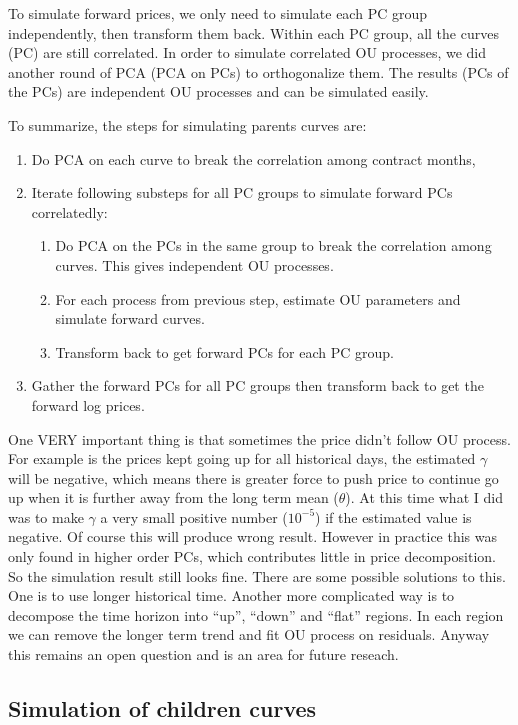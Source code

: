 \documentclass[12pt]{article}
\begin{document}
To simulate forward prices, we only need to simulate
each PC group independently, then transform them back.
Within each PC group, all the curves (PC) are still correlated.
In order to simulate correlated OU processes,
we did another round of PCA (PCA on PCs) to orthogonalize them. 
The results (PCs of the PCs) are independent OU processes
and can be simulated easily. 

To summarize, the steps for simulating parents curves are:
\begin{enumerate}
\item Do PCA on each curve to break the 
correlation among contract months, 
\item Iterate following substeps for all PC groups 
to simulate forward PCs correlatedly:
\begin{enumerate}
\item Do PCA on the PCs in the same group to break the correlation among curves. 
This gives independent OU processes. 
\item For each process from previous step, estimate OU parameters
and simulate forward curves.
\item Transform back to get forward PCs for each PC group.
\end{enumerate}
\item Gather the forward PCs for all PC groups then transform 
back to get the forward log prices.
\end{enumerate} 

One VERY important thing is that sometimes the price didn't 
follow OU process. For example is the prices 
kept going up  for all historical days, 
the estimated $\gamma$ will be negative, which means 
there is greater force to push price to continue go up when 
it is further away from the long term mean ($\theta$).
At this time what I did was to make $\gamma$ 
a very small positive number ($10^{-5}$) if the estimated value
is negative. Of course this will produce 
wrong result. However in practice this was only 
found in higher order PCs, which contributes little
in price decomposition. So the simulation result still looks fine.
There are some possible solutions to this.
One is to use longer historical time. Another more
complicated way is to  
decompose the time horizon into ``up'', ``down''
and ``flat'' regions. In each region we can 
remove the longer term trend and fit OU
process on residuals. Anyway this remains an open 
question and is an area for future reseach.


\subsection{Simulation of children curves}
\end{document}

